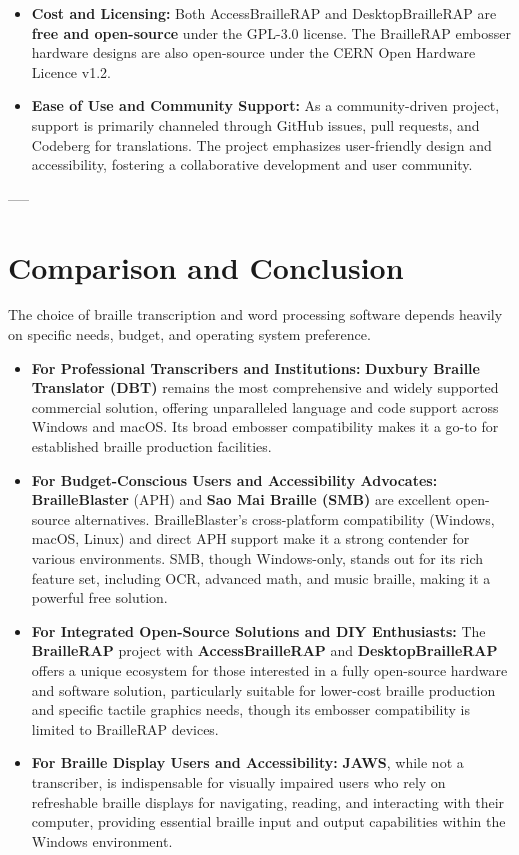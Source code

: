 \begin{itemize}
\item \textbf{Cost and Licensing:} Both AccessBrailleRAP and DesktopBrailleRAP are \textbf{free and open-source} under the GPL-3.0 license. The BrailleRAP embosser hardware designs are also open-source under the CERN Open Hardware Licence v1.2\footnotemark[11].
\item \textbf{Ease of Use and Community Support:} As a community-driven project, support is primarily channeled through GitHub issues, pull requests, and Codeberg for translations. The project emphasizes user-friendly design and accessibility, fostering a collaborative development and user community\footnotemark[10].
\end{itemize}
\vspace{1em}

-----

\section{Comparison and Conclusion}
The choice of braille transcription and word processing software depends heavily on specific needs, budget, and operating system preference.

\vspace{1em}
\begin{itemize}
\item \textbf{For Professional Transcribers and Institutions:} \textbf{Duxbury Braille Translator (DBT)} remains the most comprehensive and widely supported commercial solution, offering unparalleled language and code support across Windows and macOS. Its broad embosser compatibility makes it a go-to for established braille production facilities.
\item \textbf{For Budget-Conscious Users and Accessibility Advocates:} \textbf{BrailleBlaster} (APH) and \textbf{Sao Mai Braille (SMB)} are excellent open-source alternatives. BrailleBlaster's cross-platform compatibility (Windows, macOS, Linux) and direct APH support make it a strong contender for various environments. SMB, though Windows-only, stands out for its rich feature set, including OCR, advanced math, and music braille, making it a powerful free solution.
\item \textbf{For Integrated Open-Source Solutions and DIY Enthusiasts:} The \textbf{BrailleRAP} project with \textbf{AccessBrailleRAP} and \textbf{DesktopBrailleRAP} offers a unique ecosystem for those interested in a fully open-source hardware and software solution, particularly suitable for lower-cost braille production and specific tactile graphics needs, though its embosser compatibility is limited to BrailleRAP devices.
\item \textbf{For Braille Display Users and Accessibility:} \textbf{JAWS}, while not a transcriber, is indispensable for visually impaired users who rely on refreshable braille displays for navigating, reading, and interacting with their computer, providing essential braille input and output capabilities within the Windows environment.
\end{itemize}
\vspace{1em}

